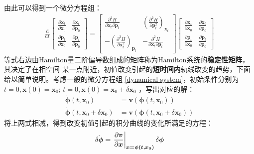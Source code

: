     由此可以得到一个微分方程组：
    \begin{equation}
        \displaystyle
        \begin{split}
            \frac {\mathrm{d}}{\mathrm{d}t}
            \begin{bmatrix}
                \frac {\partial \bm{x}_t}{\partial \bm{x}_0} & \frac {\partial \bm{x}_t}{\partial \bm{p}_0}\\
                \frac {\partial \bm{p}_t}{\partial \bm{x}_0} & \frac {\partial \bm{p}_t}{\partial \bm{p}_0}
            \end{bmatrix}
            =
            \begin{bmatrix}
                \frac {\partial^2 H}{\partial \bm{x}_t \partial \bm{p}_t} & (\frac {\partial^2 H}{\partial \bm{p}_t^2})_{\bm{x}_t}\\
                -(\frac {\partial^2 H}{\partial \bm{x}_t^2})_{\bm{p}_t} & - \frac {\partial^2 H}{\partial \bm{x}_t \partial \bm{p}_t}
            \end{bmatrix}
            \begin{bmatrix}
                \frac {\partial \bm{x}_t}{\partial \bm{x}_0} & \frac {\partial \bm{x}_t}{\partial \bm{p}_0}\\
                \frac {\partial \bm{p}_t}{\partial \bm{x}_0} & \frac {\partial \bm{p}_t}{\partial \bm{p}_0}
            \end{bmatrix}
        \end{split}
    \end{equation}
    等式右边由Hamilton量二阶偏导数组成的矩阵称为Hamilton系统的\textbf{稳定性矩阵}，其决定了在相空间
    某一点附近，初值改变引起的\textbf{短时间内}轨线改变的趋势，下面给以简单说明。考虑一般的微分方程组
    \ref{dynamical system}，初始条件分别为$t=0, \bm{x}(0) = \bm{x}_0;\, t=0, \bm{x}(0) = \bm{x}_0 + \delta\bm{x}_0$
    ，写出对应的解：
    \begin{equation}
        \begin{split}
            \dot{\bm{\phi}}(t, \bm{x}_0) &= \bm{v}(\bm{\phi}(t, \bm{x}_0))\\
            \dot{\bm{\phi}}(t, \bm{x}_0 + \delta\bm{x}_0) &= \bm{v}(\bm{\phi}(t, \bm{x}_0 + \delta\bm{x}_0))
        \end{split}
    \end{equation}
    将上两式相减，得到改变初值引起的积分曲线的变化所满足的方程：
    \begin{equation}
        \dot{\delta\bm{\phi}} = \left.\frac{\partial{\bm{v}}}{\partial{\bm{x}}}\right|_{\bm{x = \bm{\phi(t, \bm{x}_0)}}} \delta\bm{\phi}
    \end{equation}
